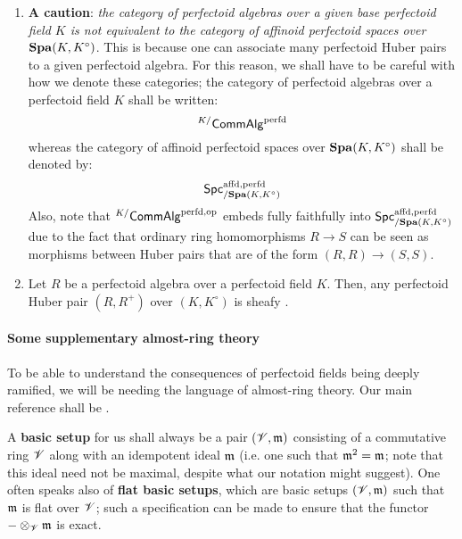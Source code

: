                     \begin{remark} \label{remark: perfectoid_affinoids}
                        \noindent
                        \begin{enumerate}
                            \item \textbf{A caution}: \textit{the category of perfectoid algebras over a given base perfectoid field $K$ is not equivalent to the category of affinoid perfectoid spaces over $\mathbf{Spa}(K, K^{\circ})$}. This is because one can associate many perfectoid Huber pairs to a given perfectoid algebra. For this reason, we shall have to be careful with how we denote these categories; the category of perfectoid algebras over a perfectoid field $K$ shall be written:
                                $${}^{K/}\mathsf{Comm}\mathsf{Alg}^{\mathrm{perfd}}$$
                            whereas the category of affinoid perfectoid spaces over $\mathbf{Spa}(K, K^{\circ})$ shall be denoted by:
                                $$\mathsf{Spc}^{\mathrm{affd}, \mathrm{perfd}}_{/\mathbf{Spa}(K, K^{\circ})}$$
                            Also, note that ${}^{K/}\mathsf{Comm}\mathsf{Alg}^{\mathrm{perfd}, \mathrm{op}}$ embeds fully faithfully into $\mathsf{Spc}^{\mathrm{affd}, \mathrm{perfd}}_{/\mathbf{Spa}(K, K^{\circ})}$ due to the fact that ordinary ring homomorphisms $R \to S$ can be seen as morphisms between Huber pairs that are of the form $(R, R) \to (S, S)$.
                            \item Let $R$ be a perfectoid algebra over a perfectoid field $K$. Then, any perfectoid Huber pair $(R, R^+)$ over $(K, K^{\circ})$ is sheafy \cite[Theorem 6.3]{scholze2011perfectoid}.
                        \end{enumerate}
                    \end{remark}
                    
                \paragraph{Some supplementary almost-ring theory}
                    To be able to understand the consequences of perfectoid fields being deeply ramified, we will be needing the language of almost-ring theory. Our main reference shall be \cite[Chapter 14]{gabber_ramero_almost_ring_theory}.
                    
                    \begin{convention} \label{conv: basic_setups}
                        A \textbf{basic setup} for us shall always be a pair $(\mathscr{V}, \mathfrak{m})$ consisting of a commutative ring $\mathscr{V}$ along with an idempotent ideal $\mathfrak{m}$ (i.e. one such that $\mathfrak{m}^2 = \mathfrak{m}$; note that this ideal need not be maximal, despite what our notation might suggest). One often speaks also of \textbf{flat basic setups}, which are basic setups $(\mathscr{V}, \mathfrak{m})$ such that $\mathfrak{m}$ is flat over $\mathscr{V}$; such a specification can be made to ensure that the functor $- \tensor_{\scrV} \m$ is exact.
                    \end{convention}
                    
